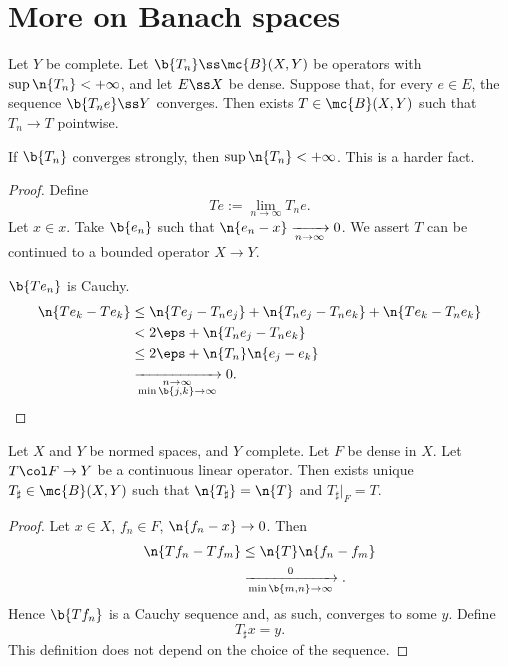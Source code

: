 \section{More on Banach spaces}

\begin{theorem}
  Let $Y$ be complete.
  Let $\b{T_n} \ss \mc{B}(X, Y)$ be operators with $\sup \n{T_n} < +\infty$, and let $E \ss X$ be dense.
  Suppose that, for every $e \in E$, the sequence $\b{T_ne} \ss Y$ converges.
  Then exists $T \in \mc{B}(X, Y)$ such that $T_n \to T$ pointwise.
\end{theorem}

\begin{remark}
  If $\b{T_n}$ converges strongly, then $\sup \n{T_n} < +\infty$.
  This is a harder fact.  
\end{remark}

\begin{proof}
  Define
  $$ Te := \lim_{n \to \infty} T_n e. $$
  Let $x\in x$. Take $\b{e_n}$ such that $\n{e_n-x} \xrightarrow[n\to\infty]{} 0$.
  We assert $T$ can be continued to a bounded operator $X \to Y$.
  
  $\b{Te_n}$ is Cauchy.
  \begin{align*}
    \n{Te_k-Te_k}
    &\le \n{Te_j-T_ne_j} + \n{T_ne_j-T_ne_k}+\n{Te_k-T_ne_k} \\
    &< 2\eps + \n{T_ne_j-T_ne_k} \\
    &\le 2\eps + \n{T_n}\n{e_j-e_k} \\
    &\xrightarrow[\substack{n\to \infty\\ \min\b{j,k}\to\infty}]{} 0.
  \end{align*}
\end{proof}

\begin{theorem}
  Let $X$ and $Y$ be normed spaces, and $Y$ complete.
  Let $F$ be dense in $X$.
  Let $T \col F \to Y$ be a continuous linear operator.
  Then exists unique $T_\sharp  \in \mc{B}(X, Y)$ such that $\n{T_\sharp} = \n{T}$ and $T_\sharp|_F = T$. 
\end{theorem}

\begin{proof}
  Let $x \in X$, $f_n \in F$, $\n{f_n-x} \to 0$.
  Then
  \begin{align*}
    \n{Tf_n - Tf_m}
    &\le \n{T} \n{f_n-f_m} \\
    &\xrightarrow[\min\b{m,n} \to \infty] 0.
  \end{align*}
  Hence $\b{Tf_n}$ is a Cauchy sequence and, as such, converges to some $y$.
  Define
  $$ T_\sharp x = y. $$
  This definition does not depend on the choice of the sequence.
\end{proof}

